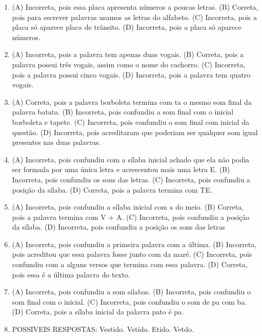 
\begin{enumerate}
\item
(A) Incorreta, pois essa placa apresenta números a poucas letras.
(B) Correta, pois para escrever palavras usamos as letras do alfabeto.
(C) Incorreta, pois a placa só aparece placa de trânsito.
(D) Incorreta, pois a placa só aparece números.

\item
(A) Incorreta, pois a palavra tem apenas duas vogais.
(B) Correta, pois a palavra possui três vogais, assim como o nome do
cachorro.
(C) Incorreta, pois a palavra possui cinco vogais.
(D) Incorreta, pois a palavra tem quatro vogais.

\item
(A) Correta, pois a palavra borboleta termina com ta o mesmo som final
da palavra batata.
(B) Incorreta, pois confundiu a som final com o inicial borboleta e
tapete.
(C) Incorreta, pois confundiu o som final com inicial da questão.
(D) Incorreta, pois acreditaram que poderiam ser qualquer som igual
presentes nas duas palavras.

\item
(A) Incorreta, pois confundiu com a sílaba inicial achado que ela não
podia ser formada por uma única letra e acrescentou mais uma letra E.
(B) Incorreta, pois confundiu os sons das letras.
(C) Incorreta, pois confundiu a posição da sílaba.
(D) Correta, pois a palavra termina com TE.

\item
(A) Incorreta, pois confundiu a sílaba inicial com a do meio.
(B) Correta, pois a palavra termina com V + A.
(C) Incorreta, pois confundiu a posição da sílaba.
(D) Incorreta, pois confundiu a posição os sons das letras

\item
(A) Incorreta, pois confundiu a primeira palavra com a última.
(B) Incorreta, pois acreditou que essa palavra fosse junto com da maré.
(C) Incorreta, pois confundiu com a alguns versos que termina com essa palavra.
(D) Correta, pois essa é a última palavra do texto.

\item
(A) Incorreta, pois confundiu a som silabas.
(B) Incorreta, pois confundiu o som final com o inicial.
(C) Incorreta, pois confundiu o som de pa com ba.
(D) Correta, pois a sílaba inicial da palavra pato é pa.

\item
POSSIVEIS RESPOSTAS:
Vestido.
Vetido.
Etido.
Vetdo.


\end{enumerate}
